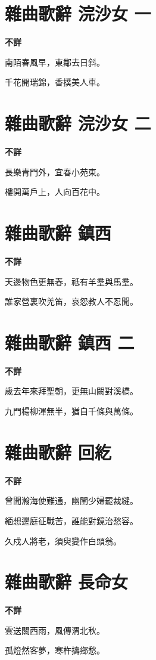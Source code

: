 \documentclass[12pt,a4paper]{ctexbook}
\begin{document}
\section{雜曲歌辭 浣沙女 一}
\textbf{不詳}\par\vspace{0.5em}
南陌春風早，東鄰去日斜。\par
千花開瑞錦，香撲美人車。\par

\section{雜曲歌辭 浣沙女 二}
\textbf{不詳}\par\vspace{0.5em}
長樂青門外，宜春小苑東。\par
樓開萬戶上，人向百花中。\par

\section{雜曲歌辭 鎮西}
\textbf{不詳}\par\vspace{0.5em}
天邊物色更無春，祗有羊羣與馬羣。\par
誰家營裏吹羌笛，哀怨教人不忍聞。\par

\section{雜曲歌辭 鎮西 二}
\textbf{不詳}\par\vspace{0.5em}
歲去年來拜聖朝，更無山闕對溪橋。\par
九門楊柳渾無半，猶自千條與萬條。\par

\section{雜曲歌辭 回紇}
\textbf{不詳}\par\vspace{0.5em}
曾聞瀚海使難通，幽閨少婦罷裁縫。\par
緬想邊庭征戰苦，誰能對鏡治愁容。\par
久戍人將老，須臾變作白頭翁。\par

\section{雜曲歌辭 長命女}
\textbf{不詳}\par\vspace{0.5em}
雲送關西雨，風傳渭北秋。\par
孤燈然客夢，寒杵擣鄉愁。\par
\end{document}
